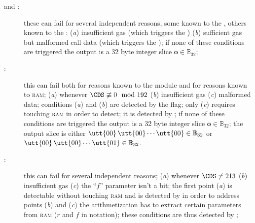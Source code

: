 \begin{description}
	\item[ and :]
		these can fail for several independent reasons, some known to the \hubMod{}, others known to the \mmuMod{}:
		(\emph{a}) insufficient gas (which triggers the \scenPrcFailureKnownToHub{})
		(\emph{b}) sufficient gas but malformed call data (which triggers the \scenPrcFailureKnownToRam{});
		if none of these conditions are triggered the output is a 32 byte integer slice $\textbf{o} \in \mathbb{B}_{32}$;
	\item[:]
		this can fail both for reasons known to the \hubMod{} module and for reasons known to \textsc{ram};
		(\emph{a}) whenever $\CDS \not\equiv 0 \mod 192$
		(\emph{b}) insufficient gas
		(\emph{c}) malformed data;
		conditions (\emph{a}) and (\emph{b}) are detected by the \scenPrcFailureKnownToHub{} flag;
		only (\emph{c}) requires touching \textsc{ram} in order to detect;
		it is detected by \scenPrcFailureKnownToRam{};
		if none of these conditions are triggered the output is a 32 byte integer slice $\textbf{o} \in \mathbb{B}_{32}$;
		the output slice is either
		$
		\utt{00}\,
		\utt{00} \cdots
		\utt{00} \in \mathbb{B}_{32}$
		or
		$
		\utt{00}\,
		\utt{00} \cdots
		\utt{01} \in \mathbb{B}_{32}$.
	\item[:]
		this can fail for several independent reasons;
		(\emph{a}) whenever $\CDS \neq 213$
		(\emph{b}) insufficient gas
		(\emph{c}) the ``$f$'' parameter isn't a bit;
		the first point (\emph{a}) is detectable without touching \textsc{ram} and is detected by \scenPrcFailureKnownToHub{} 
		in order to address points (\emph{b}) and (\emph{c}) the arithmetization has to extract certain parameters from \textsc{ram} ($r$ and $f$ in \cite{EYP-London} notation);
		these conditions are thus detected by \scenPrcFailureKnownToRam{};
\end{description}
